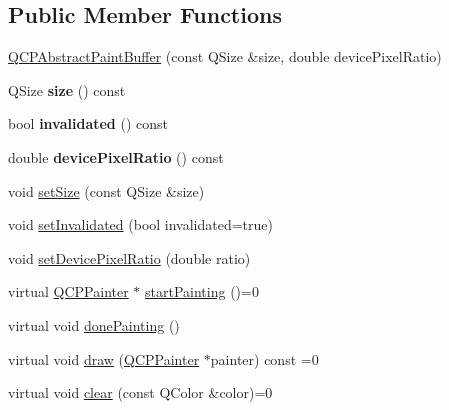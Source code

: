 \subsection*{Public Member Functions}
\begin{DoxyCompactItemize}
\item 
\mbox{\hyperlink{class_q_c_p_abstract_paint_buffer_a3ce532c12f10b81697108835755641e2}{Q\+C\+P\+Abstract\+Paint\+Buffer}} (const Q\+Size \&size, double device\+Pixel\+Ratio)
\item 
\mbox{\label{class_q_c_p_abstract_paint_buffer_a3ea8284e547985c5d263f26a6adfa11f}} 
Q\+Size {\bfseries size} () const
\item 
\mbox{\label{class_q_c_p_abstract_paint_buffer_a76bf771cda945a6c602cf9b7d365d92b}} 
bool {\bfseries invalidated} () const
\item 
\mbox{\label{class_q_c_p_abstract_paint_buffer_aac1b981f8c1744036610ff1a6b9461f9}} 
double {\bfseries device\+Pixel\+Ratio} () const
\item 
void \mbox{\hyperlink{class_q_c_p_abstract_paint_buffer_a8b68c3cd36533f1a4a23b5ce8cd66f01}{set\+Size}} (const Q\+Size \&size)
\item 
void \mbox{\hyperlink{class_q_c_p_abstract_paint_buffer_ae4c7dc70dfc66be2879ce297b2b3d67f}{set\+Invalidated}} (bool invalidated=true)
\item 
void \mbox{\hyperlink{class_q_c_p_abstract_paint_buffer_a555eaad5d5c806420ff35602a1bb68fa}{set\+Device\+Pixel\+Ratio}} (double ratio)
\item 
virtual \mbox{\hyperlink{class_q_c_p_painter}{Q\+C\+P\+Painter}} $\ast$ \mbox{\hyperlink{class_q_c_p_abstract_paint_buffer_a9e9f29b19c033cf02fb96f1a148463f3}{start\+Painting}} ()=0
\item 
virtual void \mbox{\hyperlink{class_q_c_p_abstract_paint_buffer_a41b0dc6e7744f19fae09f8532c207dc1}{done\+Painting}} ()
\item 
virtual void \mbox{\hyperlink{class_q_c_p_abstract_paint_buffer_afb998c7525e3ae37d9d2d46c7aaf461a}{draw}} (\mbox{\hyperlink{class_q_c_p_painter}{Q\+C\+P\+Painter}} $\ast$painter) const =0
\item 
virtual void \mbox{\hyperlink{class_q_c_p_abstract_paint_buffer_a9e253f4541dfc01992b77e8830bd7722}{clear}} (const Q\+Color \&color)=0
\end{DoxyCompactItemize}
